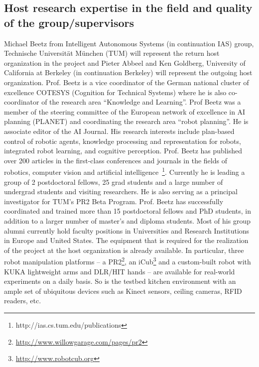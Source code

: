 \subsection{Host research expertise in the field and quality of the group/supervisors}
Michael Beetz from Intelligent Autonomous Systems (in continuation IAS) group, Technische Universit\"at 
M\"unchen (TUM) will represent the return host organization in the project and Pieter Abbeel and Ken
Goldberg, University of California at Berkeley (in continuation Berkeley) will represent
the outgoing host organization. 
Prof. Beetz is a vice coordinator of the German national cluster of excellence 
COTESYS (Cognition for Technical Systems) where he is also co-coordinator of the research area 
``Knowledge and Learning''. Prof Beetz was a member of the steering committee of the European 
network of excellence in AI planning (PLANET) and coordinating the research area ``robot planning''. 
He is associate editor of the AI Journal. His research interests include plan-based control of 
robotic agents, knowledge processing and representation for robots, integrated robot learning, and cognitive perception.
Prof. Beetz has published over 200 articles in the first-class conferences and
journals in the fields of robotics, computer vision and artificial 
intelligence~\footnote{http://ias.cs.tum.edu/publications}.
 Currently he is leading a group of 2 postdoctoral fellows, 25 grad students and a large number
of undergrad students and visiting researchers. He is also serving as a principal investigator 
for TUM's PR2 Beta Program. Prof. Beetz has successfully coordinated and trained 
more than 15 postdoctoral fellows and PhD students, in addition to a larger number of 
master's and diploma students. Most of his group alumni currently hold faculty positions in 
Universities and Research Institutions in Europe and United States.
The equipment that is required for the realization of the project at the host organization is already available. In
particular, three robot manipulation platforms -- a PR2\footnote{\url{http://www.willowgarage.com/pages/pr2}}, an
iCub\footnote{\url{http://www.robotcub.org}} and a custom-built robot
with KUKA lightweight arms and DLR/HIT hands -- are available for
real-world experiments on a daily basis. So is the testbed kitchen environment with an ample
set of ubiquitous devices such as Kinect sensors, ceiling cameras, RFID readers, etc.
\\
\begin{small}
\begin{multicols}{2}

\end{multicols}
\end{small}
\newpage
